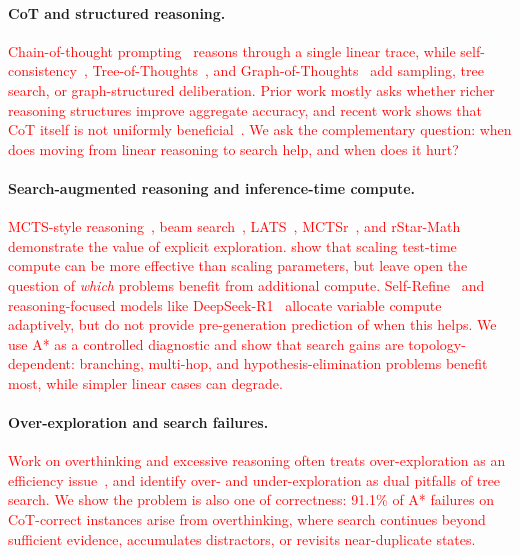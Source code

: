 \documentclass[11pt]{article}
\begin{document}
{\paragraph{CoT and structured reasoning.}
\textcolor{red}{Chain-of-thought prompting~\cite{wei2022chain} reasons through a single linear trace, while self-consistency~\cite{wang2022self}, Tree-of-Thoughts~\cite{yao2024tree}, and Graph-of-Thoughts~\cite{besta2024graph} add sampling, tree search, or graph-structured deliberation. Prior work mostly asks whether richer reasoning structures improve aggregate accuracy, and recent work shows that CoT itself is not uniformly beneficial~\cite{meincke2025cot}. We ask the complementary question: when does moving from linear reasoning to search help, and when does it hurt?}

\paragraph{Search-augmented reasoning and inference-time compute.}
\textcolor{red}{MCTS-style reasoning~\cite{hao2023reasoning}, beam search~\cite{xie2024self}, LATS~\cite{zhou2024lats}, MCTSr~\cite{zhang2024mctsrmath}, and rStar-Math~\cite{guan2025rstar} demonstrate the value of explicit exploration. \cite{snell2024scaling} show that scaling test-time compute can be more effective than scaling parameters, but leave open the question of \emph{which} problems benefit from additional compute. Self-Refine~\cite{madaan2023selfrefine} and reasoning-focused models like DeepSeek-R1~\cite{deepseekr1} allocate variable compute adaptively, but do not provide pre-generation prediction of when this helps. We use A* as a controlled diagnostic and show that search gains are topology-dependent: branching, multi-hop, and hypothesis-elimination problems benefit most, while simpler linear cases can degrade.}

\paragraph{Over-exploration and search failures.}
\textcolor{red}{Work on overthinking and excessive reasoning often treats over-exploration as an efficiency issue~\cite{sui2025overthinking,wang2025fetch,ma2025cotvalve}, and \cite{wang-etal-2025-dont} identify over- and under-exploration as dual pitfalls of tree search. We show the problem is also one of correctness: 91.1\% of A* failures on CoT-correct instances arise from overthinking, where search continues beyond sufficient evidence, accumulates distractors, or revisits near-duplicate states.}

}
\end{document}
